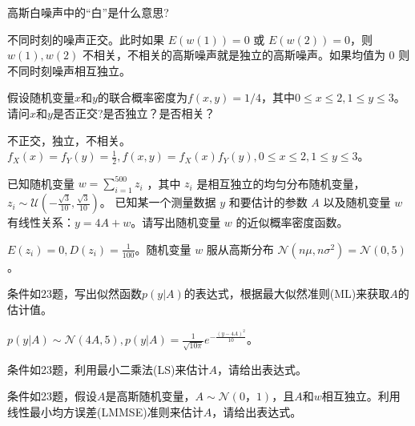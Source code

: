\begin{problem}
	高斯白噪声中的“白”是什么意思?
\end{problem}
\begin{solution}
	不同时刻的噪声正交。此时如果 $E(w(1)) = 0$ 或 $E(w(2)) = 0$，则 $w(1),w(2)$ 不相关，不相关的高斯噪声就是独立的高斯噪声。如果均值为 0 则不同时刻噪声相互独立。
\end{solution}


\begin{problem}
	假设随机变量$x$和$y$的联合概率密度为$f(x,y)=1/4$，其中$0\le x\le 2,1\le y\le 3$。请问$x$和$y$是否正交?是否独立？是否相关？
\end{problem}
\begin{solution}
	不正交，独立，不相关。$f_X(x) = f_Y(y) = \frac{1}{2},f(x, y) = f_X(x)f_Y(y),0 \le x \le 2, 1 \le y \le 3$。
\end{solution}


\begin{problem}
	已知随机变量 $w=\sum_{i=1}^{500}z_i$ ，其中 $z_i$ 是相互独立的均匀分布随机变量，$z_i\sim\mathcal{U}(-\frac{\sqrt{3}}{10},\frac{\sqrt{3}}{10})$。 已知某一个测量数据 $y$ 和要估计的参数 $A$ 以及随机变量 $w$ 有线性关系：$y=4A+w$。请写出随机变量 $w$ 的近似概率密度函数。
\end{problem}
\begin{solution}
	$E(z_i) = 0, D(z_i) = \frac{1}{100}$。随机变量 $w$ 服从高斯分布 $\mathcal{N}(n\mu, n\sigma^2) = \mathcal{N}(0, 5)$。
\end{solution}


\begin{problem}
	条件如$23$题，写出似然函数$p(y|A)$的表达式，根据最大似然准则(ML)来获取$A$的估计值。
\end{problem}
\begin{solution}
	$p(y|A) \sim \mathcal{N}(4A, 5), p(y|A) = \frac{1}{\sqrt{10\pi}}e^{-\frac{(y - 4A)^2}{10}}$。


\end{solution}


\begin{problem}
	条件如23题，利用最小二乘法(LS)来估计$A$，请给出表达式。
\end{problem}
\begin{solution}

\end{solution}


\begin{problem}
	条件如23题，假设$A$是高斯随机变量，$A\sim\mathcal{N}(0，1)$，且$A$和$w$相互独立。利用线性最小均方误差(LMMSE)准则来估计$A$，请给出表达式。
\end{problem}
\begin{solution}

\end{solution}


